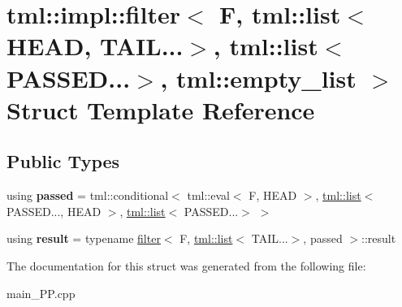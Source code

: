 \hypertarget{structtml_1_1impl_1_1filter_3_01F_00_01tml_1_1list_3_01HEAD_00_01TAIL_8_8_8_4_00_01tml_1_1list_3e7c8197a7d144a3db2d9732be6aaba91}{\section{tml\+:\+:impl\+:\+:filter$<$ F, tml\+:\+:list$<$ H\+E\+A\+D, T\+A\+I\+L...$>$, tml\+:\+:list$<$ P\+A\+S\+S\+E\+D...$>$, tml\+:\+:empty\+\_\+list $>$ Struct Template Reference}
\label{structtml_1_1impl_1_1filter_3_01F_00_01tml_1_1list_3_01HEAD_00_01TAIL_8_8_8_4_00_01tml_1_1list_3e7c8197a7d144a3db2d9732be6aaba91}
}
\subsection*{Public Types}
\begin{DoxyCompactItemize}
\item 
\hypertarget{structtml_1_1impl_1_1filter_3_01F_00_01tml_1_1list_3_01HEAD_00_01TAIL_8_8_8_4_00_01tml_1_1list_3e7c8197a7d144a3db2d9732be6aaba91_a19a8da7dbc61bb982a0e73d0779bd7c7}{using {\bfseries passed} = tml\+::conditional$<$ tml\+::eval$<$ F, H\+E\+A\+D $>$, \hyperlink{structtml_1_1list}{tml\+::list}$<$ P\+A\+S\+S\+E\+D..., H\+E\+A\+D $>$, \hyperlink{structtml_1_1list}{tml\+::list}$<$ P\+A\+S\+S\+E\+D...$>$ $>$}\label{structtml_1_1impl_1_1filter_3_01F_00_01tml_1_1list_3_01HEAD_00_01TAIL_8_8_8_4_00_01tml_1_1list_3e7c8197a7d144a3db2d9732be6aaba91_a19a8da7dbc61bb982a0e73d0779bd7c7}

\item 
\hypertarget{structtml_1_1impl_1_1filter_3_01F_00_01tml_1_1list_3_01HEAD_00_01TAIL_8_8_8_4_00_01tml_1_1list_3e7c8197a7d144a3db2d9732be6aaba91_af7a1e6f1ab237a99dec6231ce482aada}{using {\bfseries result} = typename \hyperlink{structtml_1_1impl_1_1filter}{filter}$<$ F, \hyperlink{structtml_1_1list}{tml\+::list}$<$ T\+A\+I\+L...$>$, passed $>$\+::result}\label{structtml_1_1impl_1_1filter_3_01F_00_01tml_1_1list_3_01HEAD_00_01TAIL_8_8_8_4_00_01tml_1_1list_3e7c8197a7d144a3db2d9732be6aaba91_af7a1e6f1ab237a99dec6231ce482aada}

\end{DoxyCompactItemize}


The documentation for this struct was generated from the following file\+:\begin{DoxyCompactItemize}
\item 
main\+\_\+\+P\+P.\+cpp\end{DoxyCompactItemize}
